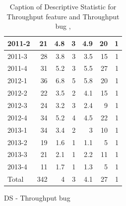 \documentclass[UKenglish]{ifimaster}  %
\begin{document}
\begin{appendices}
\begin{table}[!htbp]
\begin{adjustwidth}{-1.5cm}{}
\begin{subfigure}[b]{0.3\textwidth}
{\begin{tabular}{ | l | r | r | r | r | r | r | }
 2011-2  & 21 & 4.8 & 3 & 4.9 & 20 & 1 \\ \hline
 2011-3  & 28 & 3.8 & 3 & 3.5 & 15 & 1 \\ \hline
 2011-4  & 31 & 5.2 & 3 & 5.5 & 27 & 1 \\ \hline
 2012-1  & 36 & 6.8 & 5 & 5.8 & 20 & 1 \\ \hline
 2012-2  & 22 & 3.5 & 2 & 4.1 & 15 & 1 \\ \hline
 2012-3  & 24 & 3.2 & 3 & 2.4 & 9 & 1 \\ \hline
 2012-4  & 34 & 5.2 & 4 & 4.5 & 22 & 1 \\ \hline
 2013-1  & 34 & 3.4 & 2 & 3 & 10 & 1 \\ \hline
 2013-2  & 19 & 1.6 & 1 & 1.1 & 5 & 1 \\ \hline
 2013-3  & 21 & 2.1 & 1 & 2.2 & 11 & 1 \\ \hline
 2013-4  & 11 & 1.7 & 1 & 1.3 & 5 & 1 \\ \hline
 Total  & 342 & 4 & 3 & 4.1 & 27 & 1 \\ \hline
\end{tabular}
}
\caption{DS - Throughput bug}
 \label{DS:TPB:3}
\end{subfigure}
\end{adjustwidth}
\caption[Optional caption for list of figures]{Caption of Descriptive Statistic for Throughput feature and Throughput bug  , }
\label{DS:3:2}
\end{table}





\end{appendices}
\end{document}
